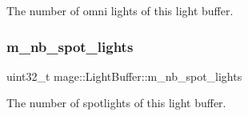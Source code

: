The number of omni lights of this light buffer. \hypertarget{structmage_1_1_light_buffer_ae81626222c4b488e896700fe8808e144}{}\label{structmage_1_1_light_buffer_ae81626222c4b488e896700fe8808e144} 
\subsubsection{\texorpdfstring{m\+\_\+nb\+\_\+spot\+\_\+lights}{m\_nb\_spot\_lights}}
{\footnotesize\ttfamily uint32\+\_\+t mage\+::\+Light\+Buffer\+::m\+\_\+nb\+\_\+spot\+\_\+lights}

The number of spotlights of this light buffer. 